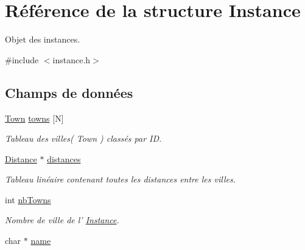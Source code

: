 \hypertarget{structInstance}{
\section{Référence de la structure Instance}
\label{structInstance}
}


Objet des instances.  




{\ttfamily \#include $<$instance.h$>$}

\subsection*{Champs de données}
\begin{DoxyCompactItemize}
\item 
\hypertarget{structInstance_a2087c5ae925e10c023ab75ae949b3a8c}{
\hyperlink{structTown}{Town} \hyperlink{structInstance_a2087c5ae925e10c023ab75ae949b3a8c}{towns} \mbox{[}N\mbox{]}}
\label{structInstance_a2087c5ae925e10c023ab75ae949b3a8c}

\begin{DoxyCompactList}\small\item\em Tableau des villes( Town ) classés par ID. \item\end{DoxyCompactList}\item 
\hypertarget{structInstance_a0712ff0f53a32bf39d8c6b46973892f7}{
\hyperlink{structDistance}{Distance} $\ast$ \hyperlink{structInstance_a0712ff0f53a32bf39d8c6b46973892f7}{distances}}
\label{structInstance_a0712ff0f53a32bf39d8c6b46973892f7}

\begin{DoxyCompactList}\small\item\em Tableau linéaire contenant toutes les distances entre les villes. \item\end{DoxyCompactList}\item 
\hypertarget{structInstance_aef5e944d6f236c31f03a4a9886e8ab99}{
int \hyperlink{structInstance_aef5e944d6f236c31f03a4a9886e8ab99}{nbTowns}}
\label{structInstance_aef5e944d6f236c31f03a4a9886e8ab99}

\begin{DoxyCompactList}\small\item\em Nombre de ville de l' \hyperlink{structInstance}{Instance}. \item\end{DoxyCompactList}\item 
\hypertarget{structInstance_a7822b9a12232dac563bd744f399cae76}{
char $\ast$ \hyperlink{structInstance_a7822b9a12232dac563bd744f399cae76}{name}}
\label{structInstance_a7822b9a12232dac563bd744f399cae76}


\end{DoxyCompactItemize}
